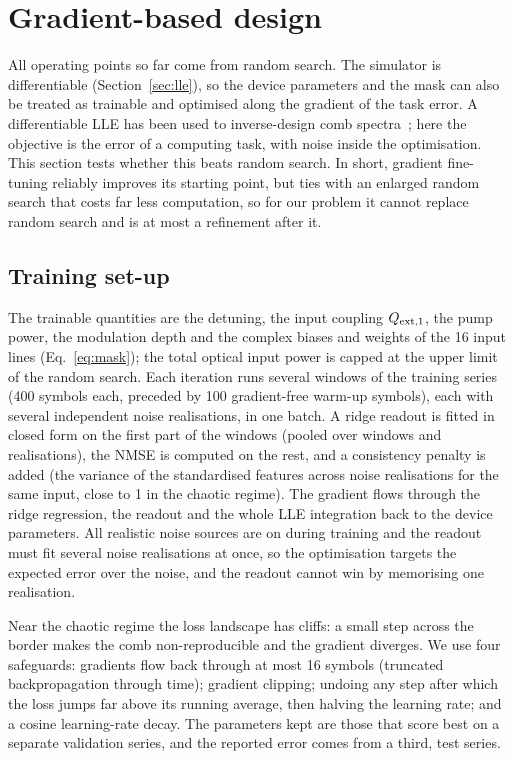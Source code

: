 \section{Gradient-based design}\label{sec:gradient}

All operating points so far come from random search. The simulator is differentiable (Section~\ref{sec:lle}), so the device
parameters and the mask can also be treated as trainable and optimised along the gradient of the task error. A differentiable LLE
has been used to inverse-design comb spectra~\cite{chuchalin2026}; here the objective is the error of a computing task, with noise
inside the optimisation. This section tests whether this beats random search. In short, gradient fine-tuning reliably improves
its starting point, but ties with an enlarged random search that costs far less computation, so for our problem it cannot replace
random search and is at most a refinement after it.

\subsection{Training set-up}

The trainable quantities are the detuning, the input coupling $Q_{\mathrm{ext},1}$, the pump power, the modulation depth and the complex biases
and weights of the 16 input lines (Eq.~\eqref{eq:mask}); the total optical input power is capped at the upper limit of the random
search. Each iteration runs several windows of the training series (400 symbols each, preceded by 100 gradient-free warm-up symbols),
each with several independent noise realisations, in one batch. A ridge readout is fitted in closed form on the first part of the
windows (pooled over windows and realisations), the NMSE is computed on the rest, and a consistency penalty is added (the variance of
the standardised features across noise realisations for the same input, close to 1 in the chaotic regime). The gradient flows through
the ridge regression, the readout and the whole LLE integration back to the device parameters. All realistic noise sources are on
during training and the readout must fit several noise realisations at once, so the optimisation targets the expected error over the
noise, and the readout cannot win by memorising one realisation.

Near the chaotic regime the loss landscape has cliffs: a small step across the border makes the comb non-reproducible and the
gradient diverges. We use four safeguards: gradients flow back through at most 16 symbols (truncated backpropagation through time);
gradient clipping; undoing any step after which the loss jumps far above its running average, then halving the learning rate; and a
cosine learning-rate decay. The parameters kept are those that score best on a separate validation series, and the reported error
comes from a third, test series.

